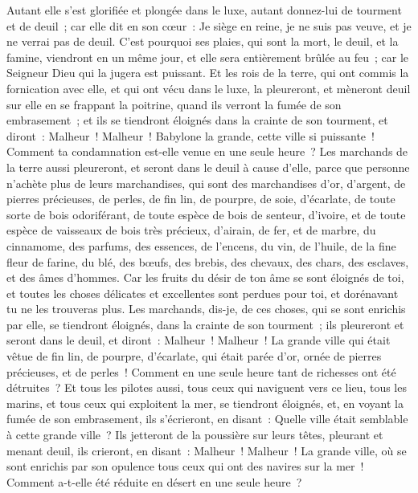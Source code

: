 \begin{multicols}{2}
Autant elle s'est glorifiée et plongée dans le luxe, autant donnez-lui de tourment et de deuil~; car elle dit en son cœur~: Je siège en reine, je ne suis pas veuve, et je ne verrai pas de deuil.
C'est pourquoi ses plaies, qui sont la mort, le deuil, et la famine, viendront en un même jour, et elle sera entièrement brûlée au feu~; car le Seigneur Dieu qui la jugera est puissant.
Et les rois de la terre, qui ont commis la fornication avec elle, et qui ont vécu dans le luxe, la pleureront, et mèneront deuil sur elle en se frappant la poitrine, quand ils verront la fumée de son embrasement~;
et ils se tiendront éloignés dans la crainte de son tourment, et diront~: Malheur~! Malheur~! Babylone la grande, cette ville si puissante~! Comment ta condamnation est-elle venue en une seule heure~?
Les marchands de la terre aussi pleureront, et seront dans le deuil à cause d'elle, parce que personne n'achète plus de leurs marchandises,
qui sont des marchandises d'or, d'argent, de pierres précieuses, de perles, de fin lin, de pourpre, de soie, d'écarlate, de toute sorte de bois odoriférant, de toute espèce de bois de senteur, d'ivoire, et de toute espèce de vaisseaux de bois très précieux, d'airain, de fer, et de marbre,
du cinnamome, des parfums, des essences, de l'encens, du vin, de l'huile, de la fine fleur de farine, du blé, des bœufs, des brebis, des chevaux, des chars, des esclaves, et des âmes d'hommes.
Car les fruits du désir de ton âme se sont éloignés de toi, et toutes les choses délicates et excellentes sont perdues pour toi, et dorénavant tu ne les trouveras plus.
Les marchands, dis-je, de ces choses, qui se sont enrichis par elle, se tiendront éloignés, dans la crainte de son tourment~; ils pleureront et seront dans le deuil,
et diront~: Malheur~! Malheur~! La grande ville qui était vêtue de fin lin, de pourpre, d'écarlate, qui était parée d'or, ornée de pierres précieuses, et de perles~! Comment en une seule heure tant de richesses ont été détruites~?
Et tous les pilotes aussi, tous ceux qui naviguent vers ce lieu, tous les marins, et tous ceux qui exploitent la mer, se tiendront éloignés,
et, en voyant la fumée de son embrasement, ils s'écrieront, en disant~: Quelle ville était semblable à cette grande ville~?
Ils jetteront de la poussière sur leurs têtes, pleurant et menant deuil, ils crieront, en disant~: Malheur~! Malheur~! La grande ville, où se sont enrichis par son opulence tous ceux qui ont des navires sur la mer~! Comment a-t-elle été réduite en désert en une seule heure~?

\end{multicols}
